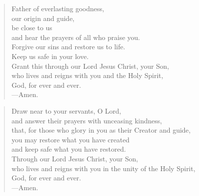 \prayer

\setlength{\leftmargini}{\prayerleftmargini}

\begin{verse}
Father of everlasting goodness,\\
our origin and guide,\\
be close to us\\
and hear the prayers of all who praise you.\\
Forgive our sins and restore us to life.\\
Keep us safe in your love.\\
Grant this through our Lord Jesus Christ, your Son,\\
who lives and reigns with you and the Holy Spirit,\\
God, for ever and ever.\\
{\color{red}---\thinspace}Amen.
\end{verse}


\begin{verse}
Draw near to your servants, O Lord,\\
and answer their prayers with unceasing kindness,\\
that, for those who glory in you as their Creator and guide,\\
you may restore what you have created\\
and keep safe what you have restored.\\
Through our Lord Jesus Christ, your Son,\\
who lives and reigns with you in the unity of the Holy Spirit,\\
God, for ever and ever.\\
{\color{red}---\thinspace}Amen.
\end{verse}

\setlength{\leftmargini}{\defleftmargini}
